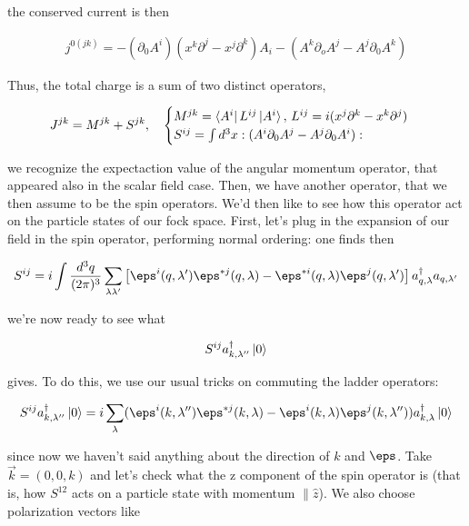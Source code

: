 \documentclass{report}
\begin{document}
the conserved current is then 

\begin{align}
    j^{0(jk)} = -(\partial_0A^i)(x^k\partial^j - x^j\partial^k)A_i - (A^k\partial_o A^j - A^j \partial_0 A^k)
\end{align}


Thus, the total charge is a sum of two distinct operators, 

\begin{align}
    J^{jk} = M^{jk} + S^{jk}, \quad \begin{cases}
        M^{jk} = \bra{A^i}L^{ij}\ket{A^i}, \, L^{ij} = i(x^j\partial^k - x^k\partial^j) \\
        S^{ij} = \int d^3x :(A^i\partial_0 A^j - A^j\partial_0 A^i): 
    \end{cases}
\end{align}

we recognize the expectaction value of the angular momentum operator, that appeared also in the scalar field case. Then, we have another operator, that we then assume to be the spin operators. We'd then like to see how this operator act on the particle states of our fock space. First, let's plug in the expansion of our field in the spin operator, performing normal ordering: one finds then 

\begin{align}
    S^{ij} = i\int \frac{d^3q}{(2\pi)^3}\sum_{\lambda \lambda'} \left[\eps^i(q, \lambda')\eps^{*j}(q, \lambda) - \eps^{*i}(q, \lambda)\eps^j(q, \lambda') \right]a^\dagger_{q, \lambda}a_{q, \lambda'}
\end{align}

we're now ready to see what 

\begin{align}
    S^{ij}a^\dagger_{k, \lambda''}\ket{0}
\end{align}

gives. To do this, we use our usual tricks on commuting the ladder operators: 

\begin{align}
    S^{ij}a^\dagger_{k, \lambda''}\ket{0} = i \sum_\lambda (\eps^i(k, \lambda'')\eps^{*j}(k, \lambda)- \eps^i(k, \lambda)\eps^j(k, \lambda''))a^\dagger_{k, \lambda}\ket{0} 
\end{align}

since now we haven't said anything about the direction of \(k\) and \(\eps\). Take \(\vec{k} = (0, 0, k)\) and let's check what the z component of the spin operator is (that is, how \(S^{12}\) acts on a particle state with momentum \(\parallel \hat{z}\)). We also choose polarization vectors like 
\end{document}
